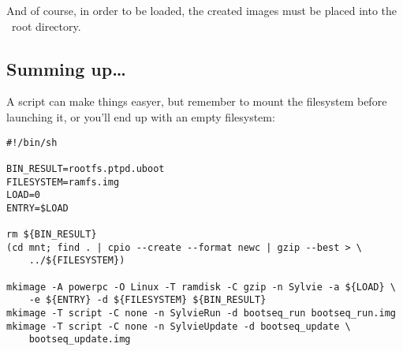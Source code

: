         And of course, in order to be loaded, the created images must be
        placed into the \TFTP\ root directory.

\subsection{Summing up\dots}

    A script can make things easyer, but remember to mount the filesystem
    before launching it, or you'll end up with an empty filesystem:
\begin{lstlisting}
#!/bin/sh

BIN_RESULT=rootfs.ptpd.uboot
FILESYSTEM=ramfs.img
LOAD=0
ENTRY=$LOAD

rm ${BIN_RESULT}
(cd mnt; find . | cpio --create --format newc | gzip --best > \
    ../${FILESYSTEM})

mkimage -A powerpc -O Linux -T ramdisk -C gzip -n Sylvie -a ${LOAD} \
    -e ${ENTRY} -d ${FILESYSTEM} ${BIN_RESULT}
mkimage -T script -C none -n SylvieRun -d bootseq_run bootseq_run.img
mkimage -T script -C none -n SylvieUpdate -d bootseq_update \
    bootseq_update.img
\end{lstlisting}

